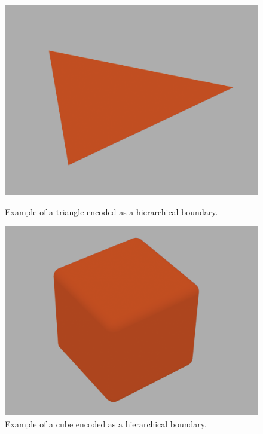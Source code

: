 \begin{figure}[ht]
  \centering
  \begin{minipage}{0.45\textwidth}
    \centering
    \includegraphics[width=\textwidth]{./figs/methodology/triangle.png}
    \caption{Example of a triangle encoded as a hierarchical boundary.}
    \label{fig:triangle_encoding}
  \end{minipage}
  \hfill
  \begin{minipage}{0.45\textwidth}
    \centering
    \includegraphics[width=\textwidth]{./figs/methodology/cube.png}
    \caption{Example of a cube encoded as a hierarchical boundary.}
    \label{fig:cube_encoding}
  \end{minipage}
\end{figure}


